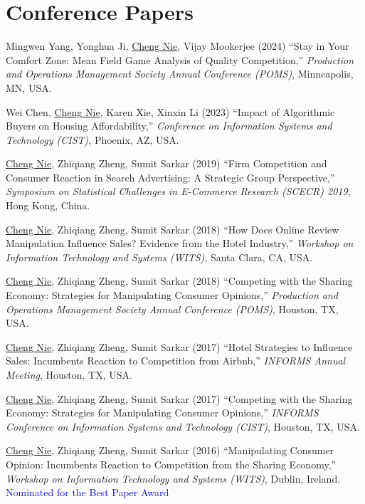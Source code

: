 \documentclass[paper=letter,fontsize=10pt]{scrartcl} %
\newcommand{\NewPart}[2]{\section*{{#1} #2}}
\newcommand{\ConfEntry}[6]{
		\noindent #1 (#2) ``#3,'' \textit{#4}, #5. \textcolor{blue}{#6}}
\newcommand{\Nie}{\underline{Cheng Nie}}
\begin{document}
\NewPart{Conference Papers}{}
\begin{etaremune}

\item \ConfEntry{Mingwen Yang, Yonghua Ji, \Nie, Vijay Mookerjee}{2024}{Stay in Your Comfort Zone: Mean Field Game Analysis of Quality Competition}{Production and Operations Management Society Annual Conference (POMS)}{Minneapolis, MN, USA}{}

\item \ConfEntry{Wei Chen, \Nie, Karen Xie, Xinxin Li}{2023}{Impact of Algorithmic Buyers on Housing Affordability}{Conference on Information Systems and Technology (CIST)}{Phoenix, AZ, USA}{}

\item \ConfEntry{\Nie, Zhiqiang Zheng, Sumit Sarkar}{2019}{Firm Competition and Consumer Reaction in Search Advertising: A Strategic Group Perspective}{Symposium on Statistical Challenges in E-Commerce Research (SCECR) 2019}{Hong Kong, China}{}

\item \ConfEntry{\Nie, Zhiqiang Zheng, Sumit Sarkar}{2018}{How Does Online Review Manipulation Influence Sales? Evidence from the Hotel Industry}{Workshop on Information Technology and Systems (WITS)}{Santa Clara, CA, USA}{}

\item \ConfEntry{\Nie, Zhiqiang Zheng, Sumit Sarkar}{2018}{Competing with the Sharing Economy: Strategies for Manipulating Consumer Opinions}{Production and Operations Management Society Annual Conference (POMS)}{Houston, TX, USA}{}

\item \ConfEntry{\Nie, Zhiqiang Zheng, Sumit Sarkar}{2017}{Hotel Strategies to Influence Sales: Incumbents Reaction to Competition from Airbnb}{INFORMS Annual Meeting}{Houston, TX, USA}{}

\item \ConfEntry{\Nie, Zhiqiang Zheng, Sumit Sarkar}{2017}{Competing with the Sharing Economy: Strategies for Manipulating Consumer Opinions}{INFORMS Conference on Information Systems and Technology (CIST)}{Houston, TX, USA}{}

\item \ConfEntry{\Nie, Zhiqiang Zheng, Sumit Sarkar}{2016}{Manipulating Consumer Opinion: Incumbents Reaction to Competition from the Sharing Economy}{Workshop on Information Technology and Systems (WITS)}{Dublin, Ireland}{\protect\newline Nominated for the Best Paper Award}


\end{etaremune}
\end{document}
